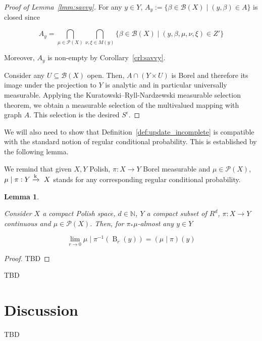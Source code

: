 \documentclass[11pt]{article}
\theoremstyle{definition}
\theoremstyle{plain}
\newtheorem{lemma}{Lemma}%
\newcommand{\Nats}{\mathbb{N}}
\newcommand{\B}{\operatorname{B}}
\newcommand{\M}{\xrightarrow{\textnormal{k}}}
\newcommand{\PM}{\mathcal{P}}
\newcommand{\Gm}{\mathcal{B}}
\begin{document}
\begin{proof}[Proof of Lemma~\ref{lmm:savvy}]
For any $y \in Y$, $A_y:=\{\beta \in \Gm(X) \mid (y,\beta) \in A\}$ is closed since

$$A_y = \bigcap_{\mu \in \PM(X)} \bigcap_{\nu,\xi \in M(y)} \{\beta \in \Gm(X) \mid (y,\beta,\mu,\nu,\xi) \in Z'\}$$

Moreover, $A_y$ is non-empty by Corollary~\ref{crl:savvy}.

Consider any $U \subseteq \Gm(X)$ open. Then, $A \cap (Y \times U)$ is Borel and therefore its image under the projection to $Y$ is analytic and in particular universally measurable. Applying the Kuratowski--Ryll-Nardzewski measurable selection theorem, we obtain a measurable selection of the multivalued mapping with graph $A$. This selection is the desired $S^\epsilon$.
\end{proof}

We will also need to show that Definition~\ref{def:update_incomplete} is compatible with the standard notion of regular conditional probability. This is established by the following lemma.

We remind that given $X,Y$ Polish, $\pi: X \rightarrow Y$ Borel measurable and $\mu \in \PM(X)$, $\mu \mid \pi: Y \M\ X$ stands for any corresponding regular conditional probability.

\begin{samepage}
\begin{lemma}
\label{lmm:update_incomplete}

Consider $X$ a compact Polish space, $d \in \Nats$, $Y$ a compact subset of $R^d$, $\pi: X \rightarrow Y$ continuous and $\mu \in \PM(X)$. Then, for $\pi_*\mu$-almost any $y \in Y$

\begin{equation}
\lim_{r \rightarrow 0}{\mu \mid \pi^{-1}(\B_r(y)) = (\mu \mid \pi)(y)}
\end{equation}

\end{lemma}
\end{samepage}

\begin{proof}

TBD
\end{proof}

TBD

\section{Discussion}

TBD

\appendix
\end{document}
